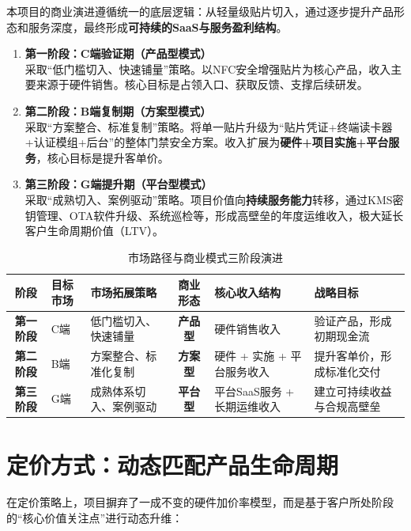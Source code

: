 本项目的商业演进遵循统一的底层逻辑：从轻量级贴片切入，通过逐步提升产品形态和服务深度，最终形成\textbf{可持续的SaaS与服务盈利结构}。

\begin{enumerate}
	\item \textbf{第一阶段：C端验证期（产品型模式）} \\
	采取“低门槛切入、快速铺量”策略。以NFC安全增强贴片为核心产品，收入主要来源于硬件销售。核心目标是占领入口、获取反馈、支撑后续研发。
	\item \textbf{第二阶段：B端复制期（方案型模式）} \\
	采取“方案整合、标准复制”策略。将单一贴片升级为“贴片凭证+终端读卡器+认证模组+后台”的整体门禁安全方案。收入扩展为\textbf{硬件+项目实施+平台服务}，核心目标是提升客单价。
	\item \textbf{第三阶段：G端提升期（平台型模式）} \\
	采取“成熟切入、案例驱动”策略。项目价值向\textbf{持续服务能力}转移，通过KMS密钥管理、OTA软件升级、系统巡检等，形成高壁垒的年度运维收入，极大延长客户生命周期价值（LTV）。
\end{enumerate}

\begin{table}[htbp]
	\centering
	\caption{市场路径与商业模式三阶段演进}
	\label{tab:business_phases}
	\renewcommand{\arraystretch}{1.4}
	\begin{tabular}{cp{1.5cm}p{3cm}cp{3.5cm}p{3cm}}
		\toprule
		\textbf{阶段} & \textbf{目标市场} & \textbf{市场拓展策略} & \textbf{商业形态} & \textbf{核心收入结构} & \textbf{战略目标} \\
		\midrule
		\textbf{第一阶段} & C端 & 低门槛切入、快速铺量 & \textbf{产品型} & 硬件销售收入 & 验证产品，形成初期现金流 \\
		\textbf{第二阶段} & B端 & 方案整合、标准化复制 & \textbf{方案型} & 硬件 + 实施 + 平台服务收入 & 提升客单价，形成标准化交付 \\
		\textbf{第三阶段} & G端 & 成熟体系切入、案例驱动 & \textbf{平台型} & 平台SaaS服务 + 长期运维收入 & 建立可持续收益与合规高壁垒 \\
		\bottomrule
	\end{tabular}
\end{table}

\section{定价方式：动态匹配产品生命周期}

在定价策略上，项目摒弃了一成不变的硬件加价率模型，而是基于客户所处阶段的“核心价值关注点”进行动态升维：


